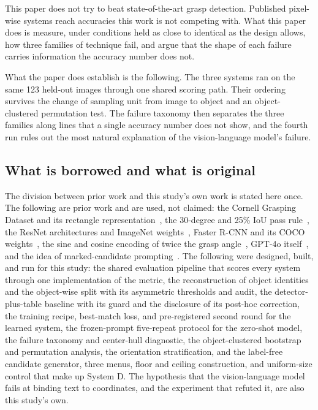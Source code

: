 \documentclass[12pt,letterpaper]{article}
\begin{document}
This paper does not try to beat state-of-the-art grasp detection. Published pixel-wise systems reach
accuracies this work is not competing with. What this paper does is
measure, under conditions held as close to identical as the design
allows, how three families of technique fail, and argue that the shape
of each failure carries information the accuracy number does not.

What the paper does establish is the following. The three systems ran on
the same 123 held-out images through one shared scoring path. Their
ordering survives the change of sampling unit from image to object and
an object-clustered permutation test. The failure taxonomy then
separates the three families along lines that a single accuracy number
does not show, and the fourth run rules out the most natural
explanation of the vision-language model's failure.


\subsection{What is borrowed and what is original}

The division between prior work and this study's own work is stated here
once. The following
are prior work and are used, not claimed: the Cornell Grasping Dataset
and its rectangle representation~\cite{jiang2011}, the 30-degree and
25\% IoU pass rule~\cite{lenz2015}, the ResNet architectures and
ImageNet weights~\cite{he2016}, Faster R-CNN and its COCO
weights~\cite{ren2015}, the sine and cosine encoding of twice the grasp
angle~\cite{redmon2015,morrison2018}, GPT-4o itself~\cite{openai2024},
and the idea of marked-candidate prompting~\cite{yang2024}. The
following were designed, built, and run for this study: the shared
evaluation pipeline that scores every system through one implementation
of the metric, the reconstruction of object identities and the
object-wise split with its asymmetric thresholds and audit, the
detector-plus-table baseline with its guard and the disclosure of its
post-hoc correction, the training recipe, best-match loss, and
pre-registered second round for the learned system, the frozen-prompt
five-repeat protocol for the zero-shot model, the failure taxonomy and
center-hull diagnostic, the object-clustered bootstrap and permutation
analysis, the orientation stratification, and the label-free
candidate generator, three menus, floor and ceiling construction, and
uniform-size control that make up System D. The hypothesis that the
vision-language model fails at binding text to coordinates, and the
experiment that refuted it, are also this study's own.
\end{document}
